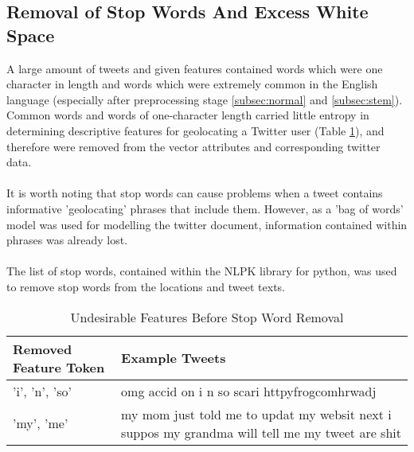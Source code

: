 \documentclass[11pt]{article}
\begin{document}
\subsection{Removal of Stop Words And Excess White Space}
A large amount of tweets and given features contained words which were one character in length and words which were extremely common in the English language (especially after preprocessing stage \ref{subsec:normal} and \ref{subsec:stem}). Common words and words of one-character length carried little entropy \citep{ra-stop} in determining descriptive features for geolocating a Twitter user (Table \ref{table:stop-words}), and therefore were removed from the vector attributes and corresponding twitter data.\\\\
It is worth noting that stop words can cause problems when a tweet contains informative 'geolocating' phrases that include them. However, as a 'bag of words' model was used for modelling the twitter document, information contained within phrases was already lost. \\\\
The list of stop words, contained within the NLPK library for python, was used to remove stop words from the locations and tweet texts.

\begin{table}[h]
	\centering
	\caption{Undesirable Features Before Stop Word Removal}
	\begin{tabular}{| l | p{12cm} |}
	\hline
	 \textbf{Removed Feature Token} & \textbf{Example Tweets}\\
	\hline
	'i', 'n', 'so' & omg accid on i n so scari httpyfrogcomhrwadj \\
	\hline
	'my', 'me'  & my mom just told me to updat my websit next i suppos my grandma will tell me my tweet are shit\\
	\hline
	\end{tabular}
	\label{table:stop-words}
\end{table}
\end{document}
